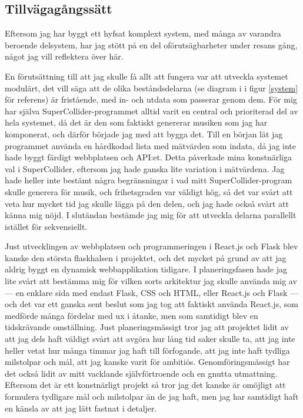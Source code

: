 \documentclass[11pt, a4paper]{article} %
\begin{document}
\subsection*{Tillvägagångssätt}
Eftersom jag har byggt ett hyfsat komplext system, med många av varandra beroende delsystem, har jag stött på en del oförutsägbarheter under resans gång, något jag vill reflektera över här.

En förutsättning till att jag skulle få allt att fungera var att utveckla systemet modulärt, det vill säga att de olika beståndsdelarna (se diagram i i figur \ref{system} för referens) är fristående, med in- och utdata som passerar genom dem. För mig har själva SuperCollider-programmet alltid varit en central och prioriterad del av hela systemet, då det är den som faktiskt genererar musiken som jag har komponerat, och därför började jag med att bygga det. Till en början lät jag programmet använda en hårdkodad lista med mätvärden som indata, då jag inte hade byggt färdigt webbplatsen och API:et. Detta påverkade mina konstnärliga val i SuperCollider, eftersom jag hade ganska lite variation i mätvärdena. Jag hade heller inte bestämt några begränsningar i vad mitt SuperCollider-program skulle generera för musik, och frihetsgraden var väldigt hög, så det var svårt att veta hur mycket tid jag skulle lägga på den delen, och jag hade också svårt att känna mig nöjd. I slutändan bestämde jag mig för att utveckla delarna parallellt istället för sekvensiellt.

Just utvecklingen av webbplatsen och programmeringen i React.js och Flask blev kanske den största flaskhalsen i projektet, och det mycket på grund av att jag aldrig byggt en dynamisk webbapplikation tidigare. I planeringsfasen hade jag lite svårt att bestämma mig för vilken sorts arkitektur jag skulle använda mig av --- en enklare sida med endast Flask, CSS och HTML, eller React.js och Flask --- och det var ett ganska sent beslut som jag tog att faktiskt använda React.js, som medförde många fördelar med \gls{ux} i åtanke, men som samtidigt blev en tidskrävande omställning. Just planeringsmässigt tror jag att projektet lidit av att jag dels haft väldigt svårt att avgöra hur lång tid saker skulle ta, att jag inte heller vetat hur många timmar jag haft till förfogande, att jag inte haft tydliga milstolpar och mål, att jag kanske varit för ambitiös. Genomföringsmässigt har det också lidit av mitt vacklande självförtroende och en gnutta utmattning. Eftersom det är ett konstnärligt projekt så tror jag det kanske är omöjligt att formulera tydligare mål och milstolpar än de jag haft, men jag har samtidigt haft en känsla av att jag lätt fastnat i detaljer. 
\end{document}
